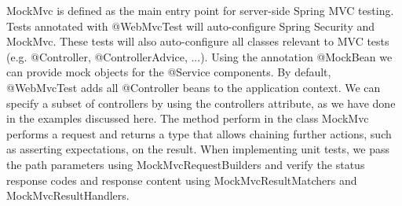 MockMvc is defined as the main entry point for server-side Spring MVC testing.
Tests annotated with @WebMvcTest will auto-configure Spring Security and MockMvc.  These tests will also auto-configure all classes relevant to MVC tests (e.g. @Controller,  @ControllerAdvice, ...).  Using the annotation @MockBean we can provide mock objects for the @Service components.
By default, @WebMvcTest adds all @Controller beans to the application context. We can specify a subset of controllers by using the controllers attribute, as we have done in the examples discussed here. 
The method perform in the class MockMvc performs a request and returns a type that allows chaining further actions,  such as asserting expectations,  on the result.
When implementing unit tests, we pass the path parameters using MockMvcRequestBuilders and verify the status response codes and response content using MockMvcResultMatchers and MockMvcResultHandlers.

